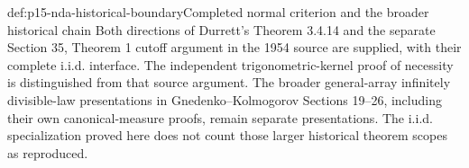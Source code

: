 \begin{proofboundary}{def:p15-nda-historical-boundary}{Completed normal criterion and the broader historical chain}
Both directions of Durrett's Theorem 3.4.14 and the separate
Section 35, Theorem 1 cutoff argument in the 1954 source are
supplied, with their complete i.i.d. interface.
The independent trigonometric-kernel proof of necessity is
distinguished from that source argument.
The broader general-array infinitely divisible-law presentations
in Gnedenko--Kolmogorov Sections 19--26, including their own
canonical-measure proofs, remain separate presentations. The
i.i.d. specialization proved here does not count those larger
historical theorem scopes as reproduced.
\end{proofboundary}
